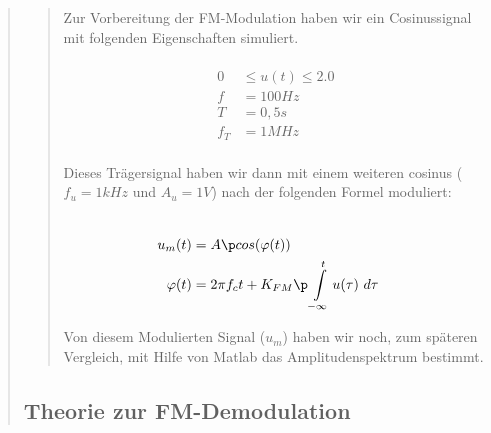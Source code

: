 \begin{quote}
\begin{quote}
        
        Zur Vorbereitung der FM-Modulation haben wir ein Cosinussignal mit folgenden Eigenschaften simuliert.
        
        \begin{equation*}
        \begin{split}
        \\
                 0 &\leq u(t) \leq 2.0
        \\
                 f &= \si{100}{Hz}
        \\
                 T &= \si{0,5}{s}
        \\
               f_T &= \si{1}{MHz}
        \\
        \end{split}
        \end{equation*}
        
        
        Dieses Trägersignal haben wir dann mit einem weiteren cosinus ($f_u = 1kHz$ und $A_u = 1V$) nach der folgenden Formel
        moduliert:
        
        \begin{equation*}
        \begin{split}
        \\
                u_m(t) &= A \p cos(\varphi(t))
        \\
            \varphi(t) &= 2 \pi f_c t + K_{FM} \p \int\limits_{-\infty}^t u(\tau) \ d\tau  
        \\
        \end{split}
        \end{equation*}
        
        Von diesem Modulierten Signal ($u_m$) haben wir noch, zum späteren Vergleich, mit Hilfe von Matlab das Amplitudenspektrum
        bestimmt.
        
        
    \end{quote}
    
    
    \subsection{Theorie zur FM-Demodulation}
    \begin{quote}
        
        
    \end{quote}
    
    
\end{quote}



